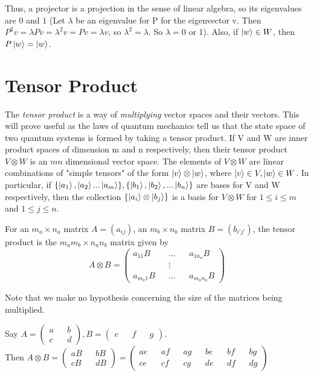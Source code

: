 Thus, a projector is a projection in the sense of linear algebra, so its eigenvalues are $0$ and $1$ (Let $\lambda$ be an eigenvalue for P for the eigenvector v. Then $P^2 v = \lambda Pv=\lambda^2 v = Pv =\lambda v$, so $\lambda^2=\lambda$. So $\lambda=0$ or 1).  Also, if $\ket{w} \in W$, then $P\ket{w}=\ket{w}$.


\pagebreak
\section{Tensor Product}

The \textit{tensor product} is a way of {\emph{multiplying}} vector spaces and their vectors. This will prove useful as the laws of quantum mechanics tell us that the state space of two quantum systems is formed by taking a tensor product. If V and W are inner product spaces of dimension m and n respectively, then their tensor product $V \otimes W$ is an $mn$ dimensional vector space. The elements of $V \otimes W$ are linear combinations of "simple tensors" of the form $\ket{v} \otimes \ket{w}$, where $\ket{v} \in V, \ket{w} \in W$. In particular, if $\{\ket{a_1}, \ket{a_2}...\ket{a_m}\}, \{\ket{b_1},\ket{b_2}, ...\ket{b_n}\}$ are bases for V and W respectively, then the collection $\{\ket{a_i}\otimes\ket{b_j}\}$ is a basis for $V \otimes W$ for $1\leq i \leq m$ and $1 \leq j \leq n$.


\begin{definition} 
For an $m_a \times n_a$ matrix $A=(a_{ij})$, an $m_b \times n_b$ matrix $B=(b_{i'j'})$, the tensor product is the $m_a m_b \times n_a n_b$ matrix given by
\begin{equation}
A \otimes B=\begin{pmatrix}
a_{11}B && \hdots && a_{1n_a}B\\
&& \vdots && \\ 
a_{m_a1}B && \hdots && a_{m_a n_a}B
\end{pmatrix}    
\end{equation}
\end{definition}
Note that we make no hypothesis concerning the size of the matrices being multiplied.

\begin{example}
Say $A=\begin{pmatrix}
a && b\\
c && d
\end{pmatrix},
B=\begin{pmatrix}
e && f && g
\end{pmatrix}$.\\
Then $A \otimes B
=\begin{pmatrix}
aB && bB\\
cB && dB
\end{pmatrix}
=\begin{pmatrix} 
ae && af && ag && be && bf && bg\\
ce && cf && cg && de && df && dg
\end{pmatrix}$
\end{example}


